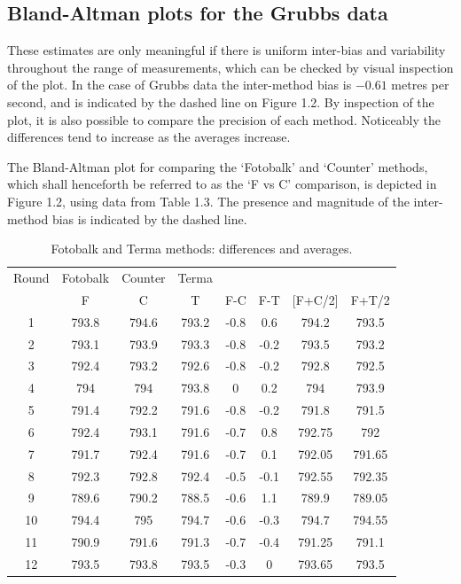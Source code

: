 \documentclass[Main.tex]{subfiles}
\begin{document}
\subsection{Bland-Altman plots for the Grubbs data}
These estimates are only meaningful if there is uniform inter-bias and variability throughout the
range of measurements, which can be checked by visual inspection of the plot. In the case of Grubbs data the inter-method bias is $-0.61$ metres per second, and is indicated by the dashed line on Figure 1.2. By inspection of the plot, it is also possible to
compare the precision of each method. Noticeably the differences tend to increase as the averages increase.


	
The Bland-Altman plot for comparing the `Fotobalk' and `Counter' methods, which shall henceforth be referred to as the `F vs C'
comparison,  is depicted in Figure 1.2, using data from Table 1.3. The presence and magnitude of the inter-method bias is indicated
	by the dashed line.

	


	
	\begin{table}[h!]
		\renewcommand\arraystretch{0.7}%
		\begin{center}
			\begin{tabular}{|c||c|c|c||c|c||c|c|}
				\hline

Round	&	Fotobalk	&	Counter	&	Terma	&		&		&		&		\\
&	F	&	C	&	T	&	F-C	&	F-T	&	[F+C/2]	&	F+T/2	\\ \hline
1	&	793.8	&	794.6	&	793.2	&	-0.8	&	0.6	&	794.2	&	793.5	\\
2	&	793.1	&	793.9	&	793.3	&	-0.8	&	-0.2	&	793.5	&	793.2	\\
3	&	792.4	&	793.2	&	792.6	&	-0.8	&	-0.2	&	792.8	&	792.5	\\
4	&	794	&	794	&	793.8	&	0	&	0.2	&	794	&	793.9	\\
5	&	791.4	&	792.2	&	791.6	&	-0.8	&	-0.2	&	791.8	&	791.5	\\
6	&	792.4	&	793.1	&	791.6	&	-0.7	&	0.8	&	792.75	&	792	\\
7	&	791.7	&	792.4	&	791.6	&	-0.7	&	0.1	&	792.05	&	791.65	\\
8	&	792.3	&	792.8	&	792.4	&	-0.5	&	-0.1	&	792.55	&	792.35	\\
9	&	789.6	&	790.2	&	788.5	&	-0.6	&	1.1	&	789.9	&	789.05	\\
10	&	794.4	&	795	&	794.7	&	-0.6	&	-0.3	&	794.7	&	794.55	\\
11	&	790.9	&	791.6	&	791.3	&	-0.7	&	-0.4	&	791.25	&	791.1	\\
12	&	793.5	&	793.8	&	793.5	&	-0.3	&	0	&	793.65	&	793.5	\\

				
				\hline
			\end{tabular}
			\caption{Fotobalk and Terma methods: differences and averages.}
		\end{center}
	\end{table}
	
\end{document}

